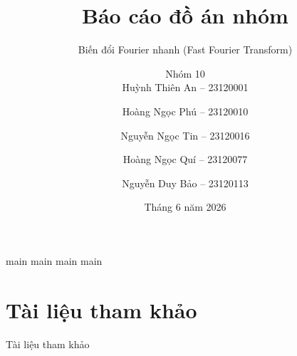 \documentclass[beamer]{beamer}
\author{
  Nhóm 10 \\
  Huỳnh Thiên An -- 23120001 \and
  Hoàng Ngọc Phú -- 23120010 \and
  Nguyễn Ngọc Tin -- 23120016 \and
  Hoàng Ngọc Quí -- 23120077 \and
  Nguyễn Duy Bảo -- 23120113
}
\title{Báo cáo đồ án nhóm}
\subtitle{Biến đổi Fourier nhanh (Fast Fourier Transform)}
\date{Tháng 6 năm 2026}
\begin{document}
\begin{frame}[plain]
  \titlepage
\end{frame}

{main}
{main}
{main}
{main}

\section*{Tài liệu tham khảo}

\begin{frame}{Tài liệu tham khảo}
  \nocite{*}
  
  
\end{frame}
\end{document}
